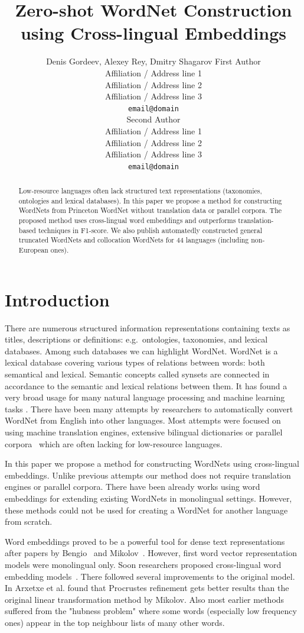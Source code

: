 \documentclass[11pt,a4paper]{article}
\title{Zero-shot WordNet Construction using Cross-lingual Embeddings}
\author{Denis Gordeev, Alexey Rey, Dmitry Shagarov
	First Author \\
  Affiliation / Address line 1 \\
  Affiliation / Address line 2 \\
  Affiliation / Address line 3 \\
  \texttt{email@domain} \\\And
  Second Author \\
  Affiliation / Address line 1 \\
  Affiliation / Address line 2 \\
  Affiliation / Address line 3 \\
  \texttt{email@domain} \\}
\date{}
\begin{document}
\maketitle
\begin{abstract}
Low-resource languages often lack structured text representations (taxonomies, ontologies and lexical databases). In this paper we propose a method for constructing WordNets from Princeton WordNet without translation data or parallel corpora. The proposed method uses cross-lingual word embeddings and outperforms translation-based techniques in F1-score. We also publish automatedly constructed general truncated WordNets and collocation WordNets for 44 languages (including non-European ones).
\end{abstract}

\section{Introduction}

There are numerous structured information representations containing texts as titles, descriptions or definitions: e.g.\ ontologies, taxonomies, and lexical databases. Among such databases we can highlight WordNet\cite{wordnet}. WordNet is a lexical database covering various types of relations between words: both semantical and lexical. Semantic concepts called synsets are connected in accordance to the semantic and lexical relations between them. It has found a very broad usage for many natural language processing and machine learning tasks \cite{kutuzovgraphwordnet,mao-semeval}.
There have been many attempts by researchers to automatically convert WordNet from English into other languages. Most attempts were focused on using machine translation engines, extensive bilingual dictionaries or parallel corpora~\cite{Khodak2017,NEALE18.1030} which are often lacking for low-resource languages.

In this paper we propose a method for constructing WordNets using cross-lingual embeddings. Unlike previous attempts our method does not require translation engines or parallel corpora. There have been already works using word embeddings for extending existing WordNets \cite{sand2017wordnet,tarouti} in monolingual settings. However, these methods could not be used for creating a WordNet for another language from scratch.

Word embeddings proved to be a powerful tool for dense text representations after papers by Bengio~\cite{bengio} and Mikolov~\cite{mikolov-representations-2013}. However, first word vector representation models were monolingual only. Soon researchers proposed cross-lingual word embedding models~\cite{mikolov-parallel}. There followed several improvements to the original model. In \citeyear{artetxe2016learning} Arxetxe et al. found that Procrustes refinement gets better results than the original linear transformation method by Mikolov. Also most earlier methods suffered from the "hubness problem" where some words (especially low frequency ones) appear in the top neighbour lists of many other words.
\end{document}
